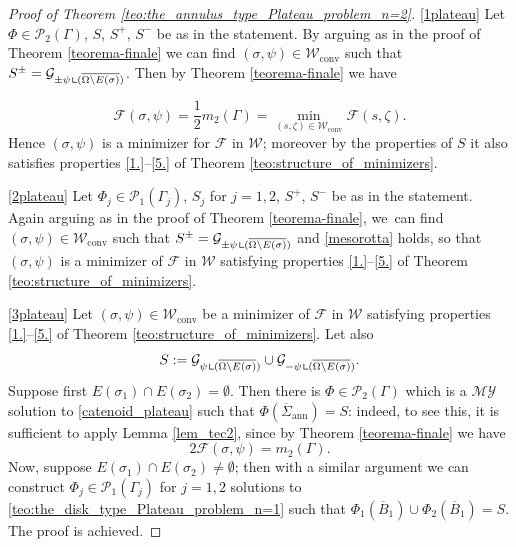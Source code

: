 \documentclass[11pt]{article}
\newcommand{\skpt}{\smallskip}
\numberwithin{equation}{section}
\let\Om\Omega
\newcommand\admclassconv{{\mathcal W_\mathrm{conv}}}
\newcommand{\immclosedann}{\Phi({\overline\Sigma}_\mathrm{ann})}
\newcommand{\resa}{\mathop{\hbox{\vrule height 7pt width 0.5pt depth 0pt
\vrule height 0.5pt width 6pt depth 0pt}}\nolimits}
\newcommand{\resb}{\mathop{\hbox{\vrule height 4pt width 0.5pt depth 0pt
\vrule height 0.5pt width 3pt depth 0pt}}\nolimits}
\newcommand{\res}{\mathchoice{\resa}{\resa}{\resb}{\resb}}
\theoremstyle{definition}
\begin{document}
\skpt
\begin{proof}[Proof of Theorem \ref{teo:the_annulus_type_Plateau_problem_n=2}]

\ref{1plateau} Let $\Phi\in\mathcal{P}_2(\Gamma)$, $S$, $S^+$, $S^-$ be as in the statement.
By arguing as in the proof of Theorem \ref{teorema-finale} we can find $(\sigma,\psi)\in\admclassconv$ such that $S^\pm=\mathcal{G}_{\pm\psi\res (\overline{\Om\setminus E(\sigma)})}$.
Then by Theorem \ref{teorema-finale} we have

\begin{equation}\label{mesorotta}
\mathcal{F}(\sigma,\psi)=\frac12 m_2(\Gamma)= \min_{(s,\zeta)\in\admclassconv}\mathcal{F}(s,\zeta).
\end{equation}
Hence $(\sigma,\psi)$ is a minimizer for $\mathcal F$ in $\mathcal W$; moreover by the properties of $S$ it also satisfies properties \ref{1.}--\ref{5.} of Theorem \ref{teo:structure_of_minimizers}.

\ref{2plateau}
Let $\Phi_j\in \mathcal{P}_1(\Gamma_j)$, $S_j$ for $j=1,2$, $S^+$, $S^-$ be as in the statement.
Again arguing as in the proof of Theorem \ref{teorema-finale}, we~can find $(\sigma,\psi)\in\admclassconv$ such that $S^\pm=\mathcal{G}_{\pm\psi\res(\overline{\Om\setminus E(\sigma)})}$ and \eqref{mesorotta} holds, so that $(\sigma,\psi)$ is a minimizer of $\mathcal F$ in $\mathcal W$ satisfying properties \ref{1.}--\ref{5.} of Theorem \ref{teo:structure_of_minimizers}.

\ref{3plateau} Let $(\sigma,\psi)\in\admclassconv$ be a minimizer of $\mathcal F$ in $\mathcal W$ satisfying properties \ref{1.}--\ref{5.} of Theorem \ref{teo:structure_of_minimizers}. Let also
\[
S:=\mathcal G_{\psi\res (\overline{\Om\setminus E(\sigma)})}\cup\mathcal G_{-\psi\res (\overline{\Om\setminus E(\sigma)})}.
\]
Suppose first $E(\sigma_1)\cap E(\sigma_2)=\emptyset$. Then
there is $\Phi\in \mathcal{P}_2(\Gamma)$ which is a $\mathcal{MY}$ solution to \eqref{catenoid_plateau} such that $\immclosedann=S$:
indeed, to see this, it is sufficient to apply Lemma \ref{lem_tec2}, since by Theorem \ref{teorema-finale} we have
\begin{equation}\label{cd0}
2\mathcal F(\sigma, \psi)= m_2(\Gamma).
\end{equation}
Now, suppose
$E(\sigma_1)\cap E(\sigma_2)\ne\emptyset$; then with a similar argument we can construct $\Phi_j\in\mathcal P_1(\Gamma_j)$ for $j=1,2$ solutions to \eqref{teo:the_disk_type_Plateau_problem_n=1} such that $\Phi_1(\overline B_1)\cup \Phi_2(\overline B_1)=S$.
The proof is achieved.
\end{proof}
\end{document}
